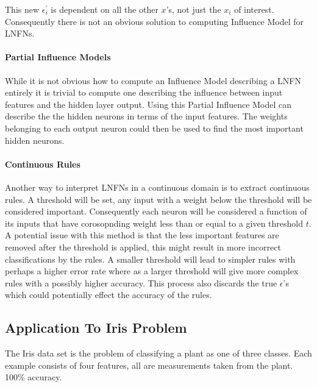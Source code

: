 This new $\epsilon^{'}_i$ is dependent on all the other $x$'s, not just the $x_i$ of interest. Consequently there is not an obvious solution to computing Influence Model for LNFNs.

\paragraph{Partial Influence Models}
While it is not obvious how to compute an Influence Model describing a LNFN entirely it is trivial to compute one describing the influence between input features and the hidden layer output. Using this Partial Influence Model can describe the the hidden neurons in terms of the input features. The weights belonging to each output neuron could then be used to find the most important hidden neurons.

\paragraph{Continuous Rules}
Another way to interpret LNFNs in a continuous domain is to extract continuous rules. A threshold will be set, any input with a weight below the threshold will be considered important. Consequently each neuron will be considered a function of its inputs that have corosopnding weight less than or equal to a given threshold $t$. A potential issue with this method is that the less important features are removed after the threshold is applied, this might result in more incorrect classifications by the rules. A smaller threshold will lead to simpler rules with perhaps a higher error rate where as a larger threshold will give more complex rules with a possibly higher accuracy. This process also discards the true $\epsilon$'s which could potentially effect the accuracy of the rules.

\subsection{Application To Iris Problem}


The Iris data set \cite{Lichman:2013} is the problem of classifying a plant as one of three classes. Each example consists of four features, all are measurements taken from the plant.  100\% accuracy.

